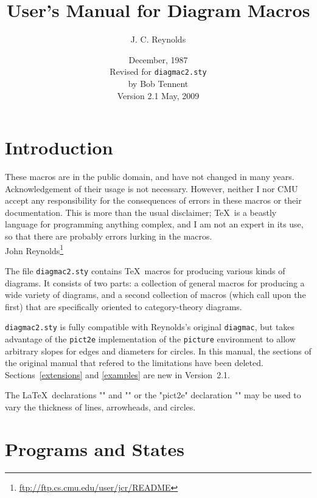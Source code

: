 \documentclass[11pt]{article}
\title{User's Manual for Diagram Macros}
\date{December, 1987\\[2ex] Revised for \texttt{diagmac2.sty}\\by Bob Tennent\\ Version 2.1 May, 2009}
\author{J. C. Reynolds}
\newcommand{\myurl}[1]{\textcolor{blue}{\underline{\textcolor{black}{\url{#1}}}}}
\begin{document}
\sloppy
\maketitle
\thispagestyle{empty}
\tableofcontents

\section{Introduction}
\begin{list}{}{\setlength{\leftmargin}{0.6in}}
\item
\footnotesize
\begin{flushright}
  These macros are in the public domain, and have not changed in many
  years. Acknowledgement of their usage is not necessary. However,
  neither I nor CMU accept any responsibility for the consequences of
  errors in these macros or their documentation. This is more than the
  usual disclaimer; \TeX\ is a beastly language for programming anything
  complex, and I am not an expert in its use, so that there are probably
  errors lurking in the macros.
\\ [1ex]
John Reynolds\footnote{\myurl{ftp://ftp.cs.cmu.edu/user/jcr/README}}
\end{flushright}
\end{list}



\enlargethispage*{4ex}
\par\noindent
The file \texttt{diagmac2.sty} contains \TeX\  macros for producing various kinds
of diagrams. It consists of two parts: a collection of general macros
for producing a wide variety of diagrams, and a second collection of
macros (which call upon the first) that are specifically oriented to
category-theory diagrams.

\texttt{diagmac2.sty} is fully compatible with Reynolds's original \texttt{diagmac}, but
takes advantage of the \texttt{pict2e} implementation of the \texttt{picture} environment
to allow arbitrary slopes for edges and diameters for circles. In
this manual, the sections of the original manual that refered to the
limitations have been deleted. Sections~\ref{extensions} and \ref{examples} are new
in Version~2.1.

The \LaTeX\  declarations "\thinlines" and "\thicklines" or the "pict2e" declaration
"\linethickness" may be used to vary
the thickness of lines, arrowheads, and circles.

\cleardoublepage
\section{Programs and States}
\end{document}
